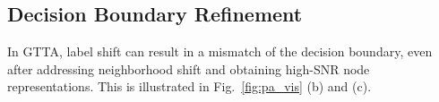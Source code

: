

\subsection{Decision Boundary Refinement}
\label{subsec:boundary}


In GTTA, label shift can result in a mismatch of the decision boundary, even after addressing neighborhood shift and obtaining high-SNR node representations. This is illustrated in  Fig.~\ref{fig:pa_vis} (b) and (c). 


